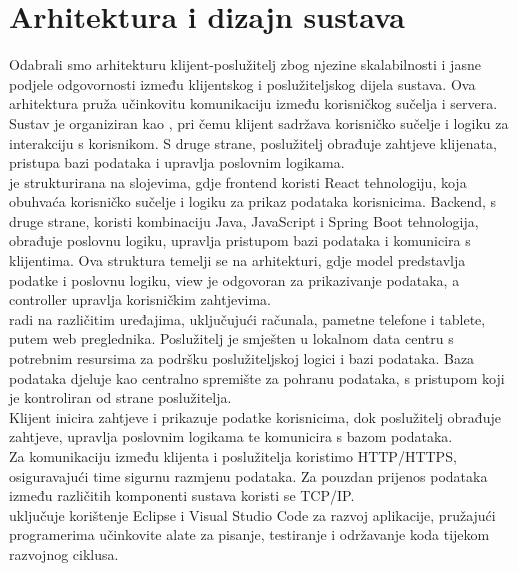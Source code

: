 \chapter{Arhitektura i dizajn sustava}
		
		\indent Odabrali smo arhitekturu klijent-poslužitelj zbog njezine skalabilnosti i jasne podjele odgovornosti između klijentskog i poslužiteljskog dijela sustava. Ova arhitektura pruža učinkovitu komunikaciju između korisničkog sučelja i servera. \\
		
		\indent Sustav je organiziran kao \textit{}, pri čemu klijent sadržava korisničko sučelje i logiku za interakciju s korisnikom. S druge strane, poslužitelj obrađuje zahtjeve klijenata, pristupa bazi podataka i upravlja poslovnim logikama. \\
		
		\indent \textit{} je strukturirana na slojevima, gdje frontend koristi React tehnologiju, koja obuhvaća korisničko sučelje i logiku za prikaz podataka korisnicima. Backend, s druge strane, koristi kombinaciju Java, JavaScript i Spring Boot tehnologija, obrađuje poslovnu logiku, upravlja pristupom bazi podataka i komunicira s klijentima. Ova struktura temelji se na \textit{} arhitekturi, gdje model predstavlja podatke i poslovnu logiku, view je odgovoran za prikazivanje podataka, a controller upravlja korisničkim zahtjevima. \\
		
		\indent \textit{} radi na različitim uređajima, uključujući računala, pametne telefone i tablete, putem web preglednika. Poslužitelj je smješten u lokalnom data centru s potrebnim resursima za podršku poslužiteljskoj logici i bazi podataka. Baza podataka djeluje kao centralno spremište za pohranu podataka, s pristupom koji je kontroliran od strane poslužitelja. \\
		
		\indent Klijent inicira zahtjeve i prikazuje podatke korisnicima, dok poslužitelj obrađuje zahtjeve, upravlja poslovnim logikama te komunicira s bazom podataka. \\
		\indent Za komunikaciju između klijenta i poslužitelja koristimo HTTP/HTTPS, osiguravajući time sigurnu razmjenu podataka. Za pouzdan prijenos podataka između različitih komponenti sustava koristi se TCP/IP. \\
		
		\indent \textit{} uključuje korištenje Eclipse i Visual Studio Code za razvoj aplikacije, pružajući programerima učinkovite alate za pisanje, testiranje i održavanje koda tijekom razvojnog ciklusa. \\
				
